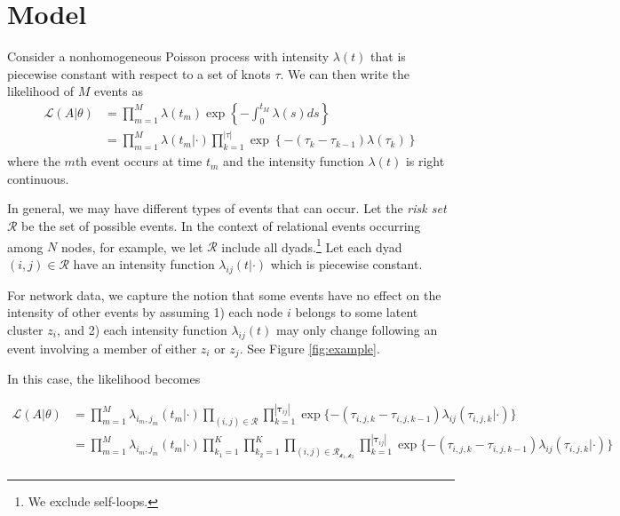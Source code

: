 \documentclass[11pt]{article}
\begin{document}
\section{Model}

Consider a nonhomogeneous Poisson process with  intensity $\lambda(t)$ that is piecewise constant with respect to a set of knots $\tau$.  We can then write the likelihood of $M$ events as
\begin{align}
\mathcal{L}(A|\theta) &= \prod_{m=1}^M \lambda(t_m) \exp\left\{ - \int_{0}^{t_M} \lambda(s)ds \right\} \\
&= \prod_{m=1}^M \lambda(t_m|\cdot) \prod_{k=1}^{|\tau|} \exp\left\{ - (\tau_{k} - \tau_{k-1}) \lambda(\tau_k) \right\}
\end{align}
\noindent where the $m$th event occurs at time $t_m$ and the intensity function $\lambda(t)$ is right continuous.

In general, we may have different types of events that can occur.  Let  the \emph{risk set}  $\mathcal{R}$ be the set of possible events.   In the context of relational events occurring among $N$ nodes, for example, we let $\mathcal{R}$ include all dyads.\footnote{We exclude self-loops.}  Let each dyad $(i,j) \in \mathcal{R}$ have an intensity function $\lambda_{ij}(t|\cdot)$ which is piecewise constant.

For network data, we capture the notion that some events have no effect on the intensity of other events by assuming 1) each node $i$ belongs to some latent cluster $z_i$, and 2) each intensity function $\lambda_{ij}(t)$ may only change following an event involving a member of either $z_i$ or $z_j$.  See Figure \ref{fig:example}.

 In this case, the likelihood becomes

\begin{align}
\mathcal{L}(A|\theta) &= \prod_{m=1}^M \lambda_{i_m,j_m}(t_m|\cdot) \prod_{(i,j) \in \mathcal{R}} \prod_{k=1}^{|\boldsymbol{\tau}_{ij}|} \exp\{ - (\tau_{i,j,k} - \tau_{i,j,k-1}) \lambda_{ij}(\tau_{i,j,k} | \cdot) \} \\
&= \prod_{m=1}^M \lambda_{i_m,j_m}(t_m|\cdot) \prod_{k_1=1}^K \prod_{k_2=1}^K \prod_{(i,j) \in \mathcal{R_{k_1,k_2}}} \prod_{k=1}^{|\boldsymbol{\tau}_{ij}|} \exp\{ - (\tau_{i,j,k} - \tau_{i,j,k-1}) \lambda_{ij}(\tau_{i,j,k} | \cdot) \} \\
\end{align}
\end{document}
